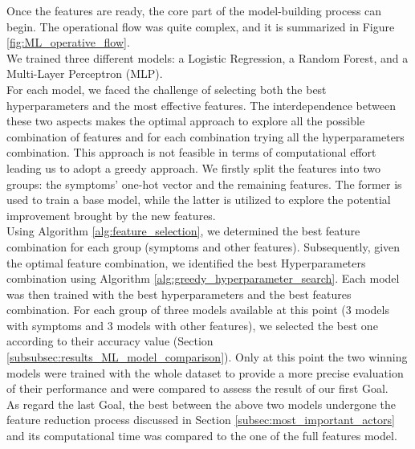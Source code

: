 Once the features are ready, the core part of the model-building process can begin. The operational flow was quite complex,
and it is summarized in Figure \ref{fig:ML_operative_flow}.\\
We trained three different models: a Logistic Regression, a Random Forest, and a Multi-Layer Perceptron (MLP).\\
For each model, we faced the challenge of selecting both the best hyperparameters and the most effective features.
The interdependence between these two aspects makes the optimal approach to explore all the possible combination of features
and for each combination trying all the hyperparameters combination. This approach is not feasible in terms of computational effort
leading us to adopt a greedy approach. We firstly split the features into two
groups: the symptoms' one-hot vector and the remaining features. The former is used to train a base model,
while the latter is utilized to explore the potential improvement brought by the new features.\\
Using Algorithm \ref{alg:feature_selection}, we determined the best feature combination for each group (symptoms and other features).
Subsequently, given the optimal feature combination, we identified the best Hyperparameters combination using Algorithm
\ref{alg:greedy_hyperparameter_search}. Each model was then trained with the best hyperparameters and the best features combination.
For each group of three models available at this point (3 models with symptoms and 3 models with other features), we selected the best one
according to their accuracy value (Section \ref{subsubsec:results_ML_model_comparison}).
Only at this point the two winning models were trained with the whole dataset to provide a more precise evaluation of their performance and
were compared to assess the result of our first Goal.\\
As regard the last Goal, the best between the above two models undergone the feature reduction process
discussed in Section \ref{subsec:most_important_actors} and its computational time was compared to the one of the full features model.\\

